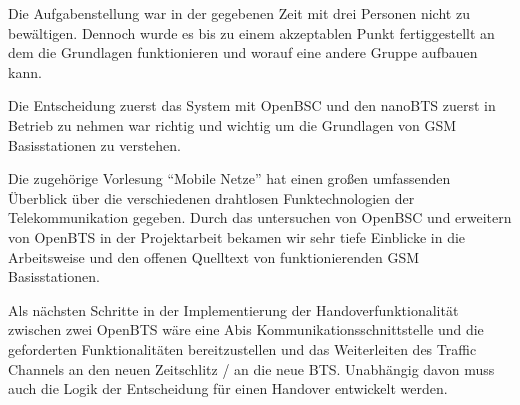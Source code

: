
Die Aufgabenstellung war in der gegebenen Zeit mit drei Personen nicht zu bewältigen. Dennoch wurde es bis zu einem akzeptablen Punkt fertiggestellt an dem die Grundlagen funktionieren und worauf eine andere Gruppe aufbauen kann.

Die Entscheidung zuerst das System mit OpenBSC und den nanoBTS zuerst in Betrieb zu nehmen war richtig und wichtig um die Grundlagen von GSM Basisstationen zu verstehen.

Die zugehörige Vorlesung "`Mobile Netze"' hat einen großen umfassenden Überblick über die verschiedenen drahtlosen Funktechnologien der Telekommunikation gegeben. Durch das untersuchen von OpenBSC und erweitern von OpenBTS in der Projektarbeit bekamen wir sehr tiefe Einblicke in die Arbeitsweise und den offenen Quelltext von funktionierenden GSM Basisstationen.

Als nächsten Schritte in der Implementierung der Handoverfunktionalität zwischen zwei OpenBTS wäre eine Abis Kommunikationsschnittstelle und die geforderten Funktionalitäten bereitzustellen und das Weiterleiten des Traffic Channels an den neuen Zeitschlitz / an die neue BTS. Unabhängig davon muss auch die Logik der Entscheidung für einen Handover entwickelt werden.
